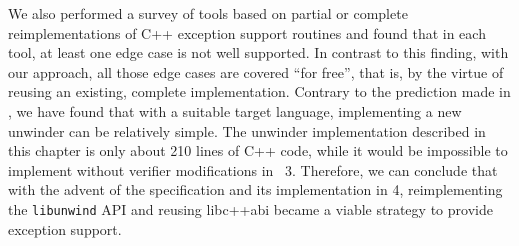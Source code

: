 We also performed a survey of tools based on partial or complete
reimplementations of C++ exception support routines and found that in
each tool, at least one edge case is not well supported. In contrast to
this finding, with our approach, all those edge cases are covered ``for
free'', that is, by the virtue of reusing an existing, complete
implementation. Contrary to the prediction made
in , we have found that with a suitable
target language, implementing a new unwinder can be relatively simple.
The unwinder implementation described in this chapter is only about 210
lines of C++ code, while it would be impossible to implement without
verifier modifications in \divine{}~3. Therefore, we can conclude that with
the advent of the \divm{} specification  and its
implementation in \divine{} 4, reimplementing the \texttt{libunwind} API
and reusing libc++abi became a viable strategy to provide
exception support.
